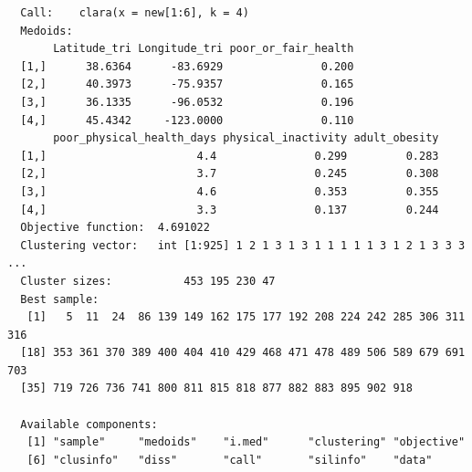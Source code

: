 \documentclass[12pt,twoside]{amherstthesis}
\begin{document}
  \begin{verbatim}
  Call:    clara(x = new[1:6], k = 4) 
  Medoids:
       Latitude_tri Longitude_tri poor_or_fair_health
  [1,]      38.6364      -83.6929               0.200
  [2,]      40.3973      -75.9357               0.165
  [3,]      36.1335      -96.0532               0.196
  [4,]      45.4342     -123.0000               0.110
       poor_physical_health_days physical_inactivity adult_obesity
  [1,]                       4.4               0.299         0.283
  [2,]                       3.7               0.245         0.308
  [3,]                       4.6               0.353         0.355
  [4,]                       3.3               0.137         0.244
  Objective function:  4.691022
  Clustering vector:   int [1:925] 1 2 1 3 1 3 1 1 1 1 1 3 1 2 1 3 3 3 ...
  Cluster sizes:           453 195 230 47 
  Best sample:
   [1]   5  11  24  86 139 149 162 175 177 192 208 224 242 285 306 311 316
  [18] 353 361 370 389 400 404 410 429 468 471 478 489 506 589 679 691 703
  [35] 719 726 736 741 800 811 815 818 877 882 883 895 902 918
  
  Available components:
   [1] "sample"     "medoids"    "i.med"      "clustering" "objective" 
   [6] "clusinfo"   "diss"       "call"       "silinfo"    "data"      
  \end{verbatim}
  
  \begin{Shaded}
  \begin{Highlighting}[]
  \end{Highlighting}
  \end{Shaded}
  
\end{document}
